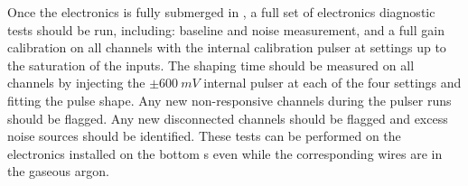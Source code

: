 Once the electronics is fully submerged in , a full 
set of electronics diagnostic tests should be run, including: 
baseline and noise measurement, and a full gain calibration on 
all channels with the internal calibration pulser at settings 
up to the saturation of the  inputs. The shaping time 
should be measured on all channels by injecting the $\pm\SI{600}{mV}$
internal pulser at each of the four settings and fitting the 
pulse shape. Any new non-responsive channels during the pulser 
runs should be flagged. Any new disconnected channels should be 
flagged and excess noise sources should be identified. These tests 
can be performed on the electronics installed on the bottom
s even while the corresponding wires are in 
the gaseous argon.

